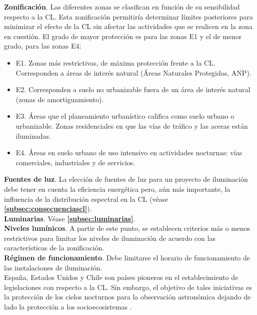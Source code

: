 \textbf{Zonificación}.
Las diferentes zonas se clasifican en función de su sensibilidad respecto a la CL. Esta zonificación permitiría determinar límites posteriores para minimizar el efecto de la CL sin afectar las actividades que se realicen en la zona en cuestión. El grado de mayor protección es para las zonas E1 y el de menor grado, para las zonas E4:

\begin{itemize}

    \item E1. Zonas más restrictivas, de máxima protección frente a la CL. Corresponden a áreas de interés natural (Áreas Naturales Protegidas, ANP).
    
    \item E2. Corresponden a suelo no urbanizable fuera de un área de interés natural (zonas de amortiguamiento).
    
    \item E3. Áreas que el planeamiento urbanístico califica como suelo urbano o urbanizable. Zonas residenciales en que las vías de tráfico y las aceras están iluminadas.
    
    \item E4. Áreas en suelo urbano de uso intensivo en actividades nocturnas: vías comerciales, industriales y de servicios.
     
\end{itemize}


\textbf{Fuentes de luz}.
La elección de fuentes de luz para un proyecto de iluminación debe tener en cuenta la eficiencia energética pero, aún más importante, la influencia de la distribución espectral en la CL (véase \textbf{\autoref{subsec:consecuenciascl}}).\\


\textbf{Luminarias}.
Véase \textbf{\autoref{subsec:luminarias}}.\\


\textbf{Niveles lumínicos}.
A partir de este punto, se establecen criterios más o menos restrictivos para limitar los niveles de iluminación de acuerdo con las características de la zonificación.\\


\textbf{Régimen de funcionamiento}.
Debe limitarse el horario de funcionamiento de las instalaciones de iluminación.\\


España, Estados Unidos y Chile son países pioneros en el establecimiento de legislaciones con respecto a la CL. Sin embargo, el objetivo de tales iniciativas es la protección de los cielos nocturnos para la observación astronómica dejando de lado la protección a los socioecosistemas \citep{LibroCL}.\\

